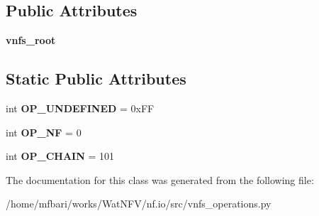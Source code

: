 \subsection*{Public Attributes}
\begin{DoxyCompactItemize}
\item 
\hypertarget{classvnfs__operations_1_1VNFSOperations_a88ae8c710ff0d9f76a72d2da2d736e34}{{\bfseries vnfs\-\_\-root}}\label{classvnfs__operations_1_1VNFSOperations_a88ae8c710ff0d9f76a72d2da2d736e34}

\end{DoxyCompactItemize}
\subsection*{Static Public Attributes}
\begin{DoxyCompactItemize}
\item 
\hypertarget{classvnfs__operations_1_1VNFSOperations_a4477fd75c80184251d2894d71e3dee5e}{int {\bfseries O\-P\-\_\-\-U\-N\-D\-E\-F\-I\-N\-E\-D} = 0x\-F\-F}\label{classvnfs__operations_1_1VNFSOperations_a4477fd75c80184251d2894d71e3dee5e}

\item 
\hypertarget{classvnfs__operations_1_1VNFSOperations_a1cde1da5a03e27b526f1a71e2a6244ff}{int {\bfseries O\-P\-\_\-\-N\-F} = 0}\label{classvnfs__operations_1_1VNFSOperations_a1cde1da5a03e27b526f1a71e2a6244ff}

\item 
\hypertarget{classvnfs__operations_1_1VNFSOperations_ad5fb3b022d90250c30bdae3f7e25c8fb}{int {\bfseries O\-P\-\_\-\-C\-H\-A\-I\-N} = 101}\label{classvnfs__operations_1_1VNFSOperations_ad5fb3b022d90250c30bdae3f7e25c8fb}

\end{DoxyCompactItemize}


The documentation for this class was generated from the following file\-:\begin{DoxyCompactItemize}
\item 
/home/mfbari/works/\-Wat\-N\-F\-V/nf.\-io/src/vnfs\-\_\-operations.\-py\end{DoxyCompactItemize}
